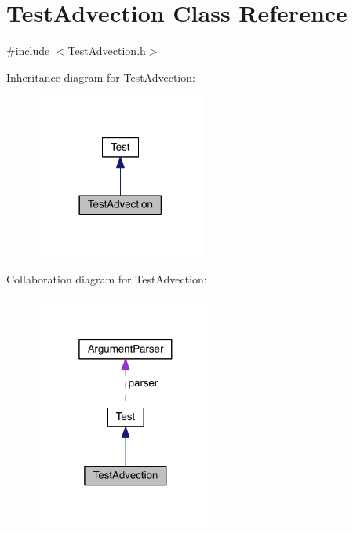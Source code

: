 \hypertarget{class_test_advection}{}\section{Test\+Advection Class Reference}
\label{class_test_advection}


{\ttfamily \#include $<$Test\+Advection.\+h$>$}



Inheritance diagram for Test\+Advection\+:\nopagebreak
\begin{figure}[H]
\begin{center}
\leavevmode
\includegraphics[width=158pt]{d6/d3e/class_test_advection__inherit__graph}
\end{center}
\end{figure}


Collaboration diagram for Test\+Advection\+:\nopagebreak
\begin{figure}[H]
\begin{center}
\leavevmode
\includegraphics[width=169pt]{d8/d43/class_test_advection__coll__graph}
\end{center}
\end{figure}
